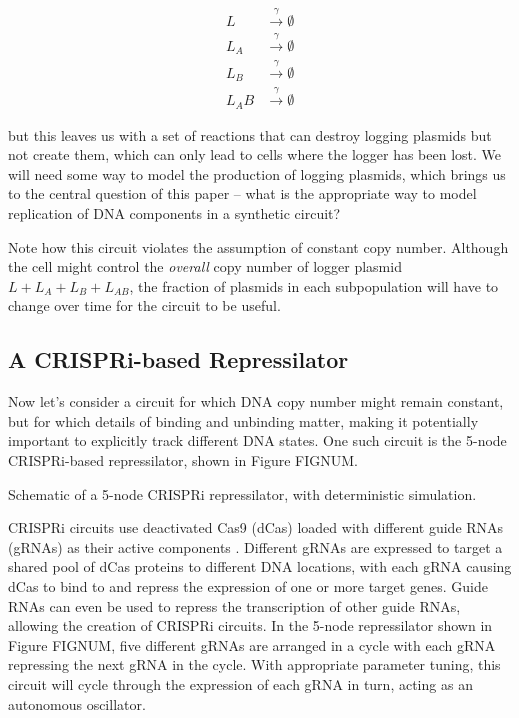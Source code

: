 \documentclass[preprint,12pt]{elsarticle}
\begin{document}
\begin{align}
	L &\xrightarrow{\gamma} \emptyset \\
	L_A &\xrightarrow{\gamma} \emptyset \\
	L_B &\xrightarrow{\gamma} \emptyset \\
	L_AB &\xrightarrow{\gamma} \emptyset			
\end{align}

but this leaves us with a set of reactions that can destroy logging plasmids but not create them, which can only lead to cells where the logger has been lost. We will need some way to model the production of logging plasmids, which brings us to the central question of this paper -- what is the appropriate way to model replication of DNA components in a synthetic circuit? 

Note how this circuit violates the assumption of constant copy number. Although the cell might control the \emph{overall} copy number of logger plasmid $L + L_A + L_B + L_{AB}$, the fraction of plasmids in each subpopulation will have to change over time for the circuit to be useful. 

\subsection{A CRISPRi-based Repressilator}\label{ss:crispriex}

Now let's consider a circuit for which DNA copy number might remain constant, but for which details of binding and unbinding matter, making it potentially important to explicitly track different DNA states. One such circuit is the 5-node CRISPRi-based repressilator, shown in Figure FIGNUM.

\vspace{.5in}
Schematic of a 5-node CRISPRi repressilator, with deterministic simulation.
\vspace{.5in}

CRISPRi circuits use deactivated Cas9 (dCas) loaded with different guide RNAs (gRNAs) as their active components \cite{Kiani2014, Nielsen2014, Gander2017, Clamons2017}. Different gRNAs are expressed to target a shared pool of dCas proteins to different DNA locations, with each gRNA causing dCas to bind to and repress the expression of one or more target genes. Guide RNAs can even be used to repress the transcription of other guide RNAs, allowing the creation of CRISPRi circuits. In the 5-node repressilator shown in Figure {FIGNUM}, five different gRNAs are arranged in a cycle with each gRNA repressing the next gRNA in the cycle. With appropriate parameter tuning, this circuit will cycle through the expression of each gRNA in turn, acting as an autonomous oscillator. 
\end{document}
